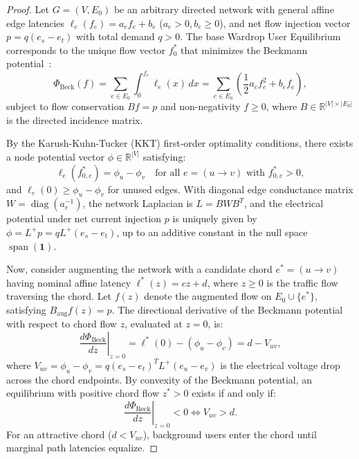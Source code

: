\documentclass[11pt,a4paper]{article}
\begin{document}
\begin{proof}
Let $G = (V, E_0)$ be an arbitrary directed network with general affine edge latencies $\ell_e(f_e) = a_e f_e + b_e$ ($a_e > 0, b_e \ge 0$), and net flow injection vector $p = q (e_s - e_t)$ with total demand $q > 0$. The base Wardrop User Equilibrium corresponds to the unique flow vector $f_0^*$ that minimizes the Beckmann potential~\cite{beckmann1956studies}:
\begin{equation}
\Phi_{\text{Beck}}(f) = \sum_{e \in E_0} \int_0^{f_e} \ell_e(x) \, dx = \sum_{e \in E_0} \left( \frac{1}{2} a_e f_e^2 + b_e f_e \right),
\end{equation}
subject to flow conservation $B f = p$ and non-negativity $f \ge 0$, where $B \in \mathbb{R}^{|V| \times |E_0|}$ is the directed incidence matrix.

By the Karush-Kuhn-Tucker (KKT) first-order optimality conditions, there exists a node potential vector $\phi \in \mathbb{R}^{|V|}$ satisfying:
\begin{equation}
\ell_e(f_{0, e}^*) = \phi_u - \phi_v \quad \text{for all } e = (u \to v) \text{ with } f_{0, e}^* > 0,
\end{equation}
and $\ell_e(0) \ge \phi_u - \phi_v$ for unused edges. With diagonal edge conductance matrix $W = \operatorname{diag}(a_e^{-1})$, the network Laplacian is $L = B W B^T$, and the electrical potential under net current injection $p$ is uniquely given by $\phi = L^+ p = q L^+ (e_s - e_t)$, up to an additive constant in the null space $\operatorname{span}(\mathbf{1})$.

Now, consider augmenting the network with a candidate chord $e^* = (u \to v)$ having nominal affine latency $\ell^*(z) = c z + d$, where $z \ge 0$ is the traffic flow traversing the chord. Let $f(z)$ denote the augmented flow on $E_0 \cup \{e^*\}$, satisfying $B_{\text{aug}} f(z) = p$. The directional derivative of the Beckmann potential with respect to chord flow $z$, evaluated at $z = 0$, is:
\begin{equation}
\left. \frac{d \Phi_{\text{Beck}}}{dz} \right|_{z=0} = \ell^*(0) - (\phi_u - \phi_v) = d - V_{uv},
\end{equation}
where $V_{uv} = \phi_u - \phi_v = q (e_s - e_t)^T L^+ (e_u - e_v)$ is the electrical voltage drop across the chord endpoints. By convexity of the Beckmann potential, an equilibrium with positive chord flow $z^* > 0$ exists if and only if:
\begin{equation}
\left. \frac{d \Phi_{\text{Beck}}}{dz} \right|_{z=0} < 0 \iff V_{uv} > d.
\end{equation}
For an attractive chord ($d < V_{uv}$), background users enter the chord until marginal path latencies equalize.


\end{proof}
\end{document}

